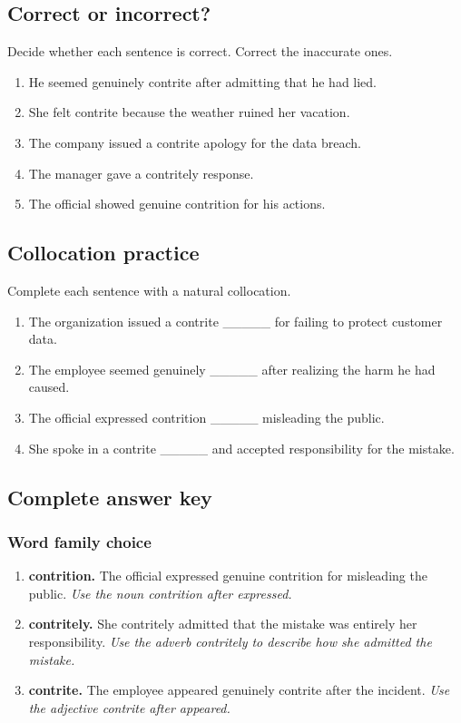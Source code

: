\documentclass[11pt]{article}
\begin{document}
\subsection{Correct or incorrect?}
Decide whether each sentence is correct. Correct the inaccurate ones.

\begin{enumerate}
  \item He seemed genuinely contrite after admitting that he had lied.
  \item She felt contrite because the weather ruined her vacation.
  \item The company issued a contrite apology for the data breach.
  \item The manager gave a contritely response.
  \item The official showed genuine contrition for his actions.
\end{enumerate}

\subsection{Collocation practice}
Complete each sentence with a natural collocation.

\begin{enumerate}
  \item The organization issued a contrite \_\_\_\_\_ for failing to protect customer data.
  \item The employee seemed genuinely \_\_\_\_\_ after realizing the harm he had caused.
  \item The official expressed contrition \_\_\_\_\_ misleading the public.
  \item She spoke in a contrite \_\_\_\_\_ and accepted responsibility for the mistake.
\end{enumerate}

\subsection{Complete answer key}
\subsubsection{Word family choice}
\begin{enumerate}
  \item \textbf{contrition.} The official expressed genuine contrition for misleading the public. \emph{Use the noun contrition after expressed.}
  \item \textbf{contritely.} She contritely admitted that the mistake was entirely her responsibility. \emph{Use the adverb contritely to describe how she admitted the mistake.}
  \item \textbf{contrite.} The employee appeared genuinely contrite after the incident. \emph{Use the adjective contrite after appeared.}
\end{enumerate}
\end{document}
